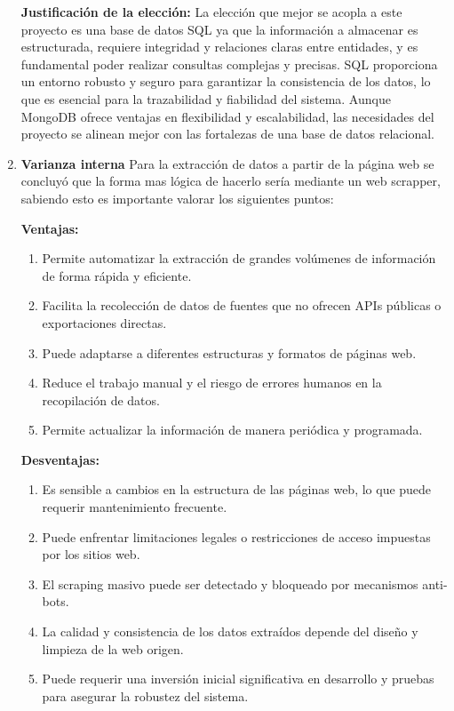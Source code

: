 \documentclass{article}
\begin{document}
\begin{enumerate}
    \textbf{Justificación de la elección:} \newline
    La elección que mejor se acopla a este proyecto es una base de datos SQL ya que la información a almacenar es estructurada, requiere integridad y relaciones claras entre entidades, y es fundamental poder realizar consultas complejas y precisas. SQL proporciona un entorno robusto y seguro para garantizar la consistencia de los datos, lo que es esencial para la trazabilidad y fiabilidad del sistema. Aunque MongoDB ofrece ventajas en flexibilidad y escalabilidad, las necesidades del proyecto se alinean mejor con las fortalezas de una base de datos relacional. 

    \item  \textbf{Varianza interna} \newline 
    Para la extracción de datos a partir de la página web se concluyó que la forma mas lógica de hacerlo sería mediante un web scrapper, sabiendo esto es importante valorar los siguientes puntos:
    
    \textbf{Ventajas:}
    \begin{enumerate}[label=\arabic*.]
        \item Permite automatizar la extracción de grandes volúmenes de información de forma rápida y eficiente.
        \item Facilita la recolección de datos de fuentes que no ofrecen APIs públicas o exportaciones directas.
        \item Puede adaptarse a diferentes estructuras y formatos de páginas web.
        \item Reduce el trabajo manual y el riesgo de errores humanos en la recopilación de datos.
        \item Permite actualizar la información de manera periódica y programada.
    \end{enumerate}
    
    \textbf{Desventajas:}
    \begin{enumerate}[label=\arabic*.]
        \item Es sensible a cambios en la estructura de las páginas web, lo que puede requerir mantenimiento frecuente.
        \item Puede enfrentar limitaciones legales o restricciones de acceso impuestas por los sitios web.
        \item El scraping masivo puede ser detectado y bloqueado por mecanismos anti-bots.
        \item La calidad y consistencia de los datos extraídos depende del diseño y limpieza de la web origen.
        \item Puede requerir una inversión inicial significativa en desarrollo y pruebas para asegurar la robustez del sistema.
    \end{enumerate}


\end{enumerate}
\end{document}
